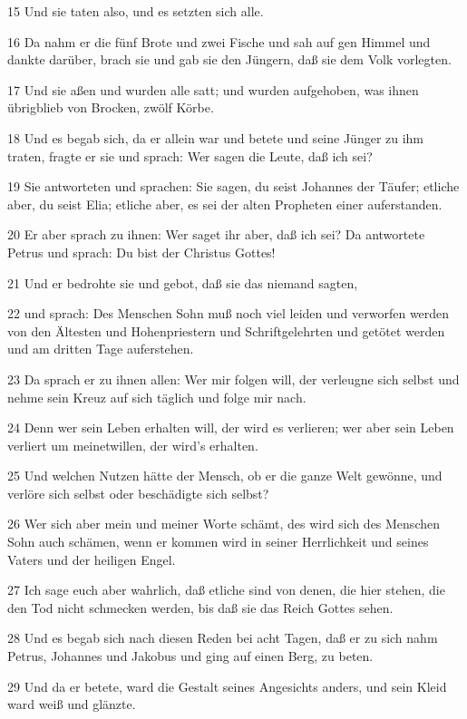 \par 15 Und sie taten also, und es setzten sich alle.
\par 16 Da nahm er die fünf Brote und zwei Fische und sah auf gen Himmel und dankte darüber, brach sie und gab sie den Jüngern, daß sie dem Volk vorlegten.
\par 17 Und sie aßen und wurden alle satt; und wurden aufgehoben, was ihnen übrigblieb von Brocken, zwölf Körbe.
\par 18 Und es begab sich, da er allein war und betete und seine Jünger zu ihm traten, fragte er sie und sprach: Wer sagen die Leute, daß ich sei?
\par 19 Sie antworteten und sprachen: Sie sagen, du seist Johannes der Täufer; etliche aber, du seist Elia; etliche aber, es sei der alten Propheten einer auferstanden.
\par 20 Er aber sprach zu ihnen: Wer saget ihr aber, daß ich sei? Da antwortete Petrus und sprach: Du bist der Christus Gottes!
\par 21 Und er bedrohte sie und gebot, daß sie das niemand sagten,
\par 22 und sprach: Des Menschen Sohn muß noch viel leiden und verworfen werden von den Ältesten und Hohenpriestern und Schriftgelehrten und getötet werden und am dritten Tage auferstehen.
\par 23 Da sprach er zu ihnen allen: Wer mir folgen will, der verleugne sich selbst und nehme sein Kreuz auf sich täglich und folge mir nach.
\par 24 Denn wer sein Leben erhalten will, der wird es verlieren; wer aber sein Leben verliert um meinetwillen, der wird's erhalten.
\par 25 Und welchen Nutzen hätte der Mensch, ob er die ganze Welt gewönne, und verlöre sich selbst oder beschädigte sich selbst?
\par 26 Wer sich aber mein und meiner Worte schämt, des wird sich des Menschen Sohn auch schämen, wenn er kommen wird in seiner Herrlichkeit und seines Vaters und der heiligen Engel.
\par 27 Ich sage euch aber wahrlich, daß etliche sind von denen, die hier stehen, die den Tod nicht schmecken werden, bis daß sie das Reich Gottes sehen.
\par 28 Und es begab sich nach diesen Reden bei acht Tagen, daß er zu sich nahm Petrus, Johannes und Jakobus und ging auf einen Berg, zu beten.
\par 29 Und da er betete, ward die Gestalt seines Angesichts anders, und sein Kleid ward weiß und glänzte.
